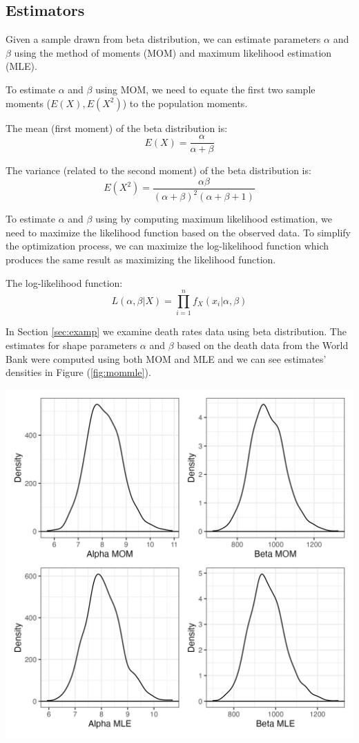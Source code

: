 \documentclass{article}\usepackage[]{graphicx}\usepackage[]{xcolor}
\newenvironment{Figure}
  {\par\medskip\noindent\minipage{\linewidth}}
  {\endminipage\par\medskip}
\begin{document}
\begin{multicols}{2}
\section{Estimators}\label{sec:estim}

Given a sample drawn from beta distribution, we can estimate parameters $\alpha$ and $\beta$ using the method of moments (MOM) and maximum likelihood estimation (MLE).

To estimate $\alpha$ and $\beta$ using MOM, we need to equate the first two sample moments ($E(X), E(X^2)$) to the population moments.

The mean (first moment) of the beta distribution is:
$$E(X) = \frac{\alpha}{\alpha + \beta}$$

The variance (related to the second moment) of the beta distribution is:
$$E(X^2) = \frac{\alpha \beta}{(\alpha + \beta)^2 (\alpha + \beta + 1)}$$

To estimate $\alpha$ and $\beta$ using by computing maximum likelihood estimation, we need to maximize the likelihood function based on the observed data. To simplify the optimization process, we can maximize the log-likelihood function which produces the same result as maximizing the likelihood function.

The log-likelihood function:
$$L(\alpha, \beta | X) = \prod_{i=1}^{n} f_X(x_i| \alpha, \beta)$$

In Section \ref{sec:examp} we examine death rates data using beta distribution. The estimates for shape parameters $\alpha$ and $\beta$ based on the death data from the World Bank were computed using both MOM and MLE and we can see estimates' densities in Figure (\ref{fig:mommle}).

\begin{Figure}
 \centering
 \includegraphics[width=\linewidth]{mommle.png}
 \label{fig:mommle}
\end{Figure}


\end{multicols}
\end{document}
